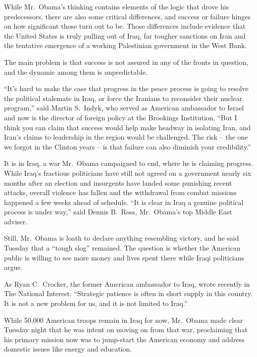﻿\documentclass[12pt]{article}
\begin{document}
While Mr.~Obama's thinking contains elements of the logic that drove his predecessors, there are
also some critical differences, and success or failure hinges on how significant those turn out to
be. Those differences include evidence that the United States is truly pulling out of Iraq, far
tougher sanctions on Iran and the tentative emergence of a working Palestinian government in the
West Bank.

The main problem is that success is not assured in any of the fronts in question, and the dynamic
among them is unpredictable.

``It's hard to make the case that progress in the peace process is going to resolve the political
stalemate in Iraq, or force the Iranians to reconsider their nuclear program,'' said Martin
S.~Indyk, who served as American ambassador to Israel and now is the director of foreign policy at
the Brookings Institution. ``But I think you can claim that success would help make headway in
isolating Iran, and Iran's claims to leadership in the region would be challenged. The risk -- the
one we forgot in the Clinton years -- is that failure can also diminish your credibility.''

It is in Iraq, a war Mr.~Obama campaigned to end, where he is claiming progress. While Iraq's
fractious politicians have still not agreed on a government nearly six months after an election and
insurgents have landed some punishing recent attacks, overall violence has fallen and the withdrawal
from combat missions happened a few weeks ahead of schedule. ``It is clear in Iraq a genuine
political process is under way,'' said Dennis B.~Ross, Mr.~Obama's top Middle East adviser.

Still, Mr.~Obama is loath to declare anything resembling victory, and he said Tuesday that a ``tough
slog'' remained. The question is whether the American public is willing to see more money and lives
spent there while Iraqi politicians argue.

As Ryan C.~Crocker, the former American ambassador to Iraq, wrote recently in The National Interest:
``Strategic patience is often in short supply in this country. It is not a new problem for us, and
it is not limited to Iraq.''

While 50,000 American troops remain in Iraq for now, Mr.~Obama made clear Tuesday night that he was
intent on moving on from that war, proclaiming that his primary mission now was to jump-start the
American economy and address domestic issues like energy and education.
\end{document}
